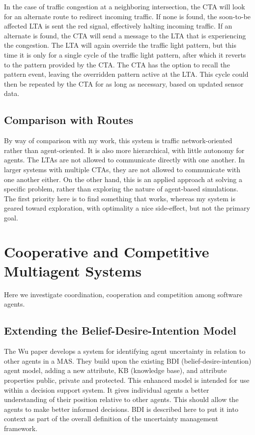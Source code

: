 \documentclass[11pt,letterpaper,onecolumn,twoside,openright,final]{report}
\begin{document}
In the case of traffic congestion at a neighboring intersection, the CTA will look for an alternate route to redirect incoming traffic.
If none is found, the soon-to-be affected LTA is sent the red signal, effectively halting incoming traffic.
If an alternate is found, the CTA will send a message to the LTA that is experiencing the congestion.
The LTA will again override the traffic light pattern, but this time it is only for a single cycle of the traffic light pattern, after which it reverts to the pattern provided by the CTA.
The CTA has the option to recall the pattern event, leaving the overridden pattern active at the LTA.
This cycle could then be repeated by the CTA for as long as necessary, based on updated sensor data.

\subsection{Comparison with Routes}
By way of comparison with my work, this system is traffic network-oriented rather than agent-oriented.
It is also more hierarchical, with little autonomy for agents.
The LTAs are not allowed to communicate directly with one another.
In larger systems with multiple CTAs, they are not allowed to communicate with one another either.
On the other hand, this is an applied approach at solving a specific problem, rather than exploring the nature of agent-based simulations.
The first priority here is to find something that works, whereas my system is geared toward exploration, with optimality a nice side-effect, but not the primary goal.

\section{Cooperative and Competitive Multiagent Systems}
Here we investigate coordination, cooperation and competition among software agents.

\subsection{Extending the Belief-Desire-Intention Model}
The Wu paper\cite{wu2003umf} develops a system for identifying agent uncertainty in relation to other agents in a MAS.
They build upon the existing BDI (belief-desire-intention) agent model, adding
a new attribute, KB (knowledge base), and attribute properties public, private and protected.
This enhanced model is intended for use within a decision support system.
It gives individual agents a better understanding of their position relative to other agents.
This should allow the agents to make better informed decisions.
BDI is described here to put it into context as part of the overall definition of the uncertainty management framework.
\end{document}
